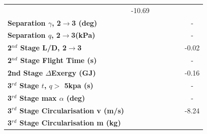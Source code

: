 \begin{table}[ht!]
\begin{tabular}{l c c c c c c}
		&-10.69
		\\
		\textbf{Separation $\gamma$, 2$\rightarrow$3 (deg)}
		& \secondthirdSeparationgammaCdNinetyNoReturn
		& \secondthirdSeparationgammaCdNinetyFiveNoReturn
		& \secondthirdSeparationgammaCdStandardNoReturn
		& \secondthirdSeparationgammaCdOneHundredFiveNoReturn
		& \secondthirdSeparationgammaCdOneHundredTenNoReturn
		& -
		\\
		\textbf{Separation $q$, 2$\rightarrow$3(kPa)}
		& \secondthirdSeparationqCdNinetyNoReturn
		& \secondthirdSeparationqCdNinetyFiveNoReturn
		& \secondthirdSeparationqCdStandardNoReturn
		& \secondthirdSeparationqCdOneHundredFiveNoReturn
		& \secondthirdSeparationqCdOneHundredTenNoReturn
		& -
		\\
		\textbf{2$^{nd}$ Stage L/D, 2$\rightarrow$3}
		& \secondthirdSeparationLDCdNinetyNoReturn
		& \secondthirdSeparationLDCdNinetyFiveNoReturn
		& \secondthirdSeparationLDCdStandardNoReturn
		& \secondthirdSeparationLDCdOneHundredFiveNoReturn
		& \secondthirdSeparationLDCdOneHundredTenNoReturn
		&-0.02
		\\
		\textbf{2$^{nd}$ Stage Flight Time (s)}
		& \secondFlightTimeCdNinetyNoReturn
		& \secondFlightTimeCdNinetyFiveNoReturn
		& \secondFlightTimeCdStandardNoReturn
		& \secondFlightTimeCdOneHundredFiveNoReturn
		& \secondFlightTimeCdOneHundredTenNoReturn
		& -
		\\
		\textbf{2nd Stage $\Delta$Exergy (GJ)}
		& \seconddExergyCdNinetyNoReturn
		& \seconddExergyCdNinetyFiveNoReturn
		& \seconddExergyCdStandardNoReturn
		& \seconddExergyCdOneHundredFiveNoReturn
		& \seconddExergyCdOneHundredTenNoReturn
		&-0.16
		\\
		\textbf{3$^{rd}$ Stage $t$, $q >$ 5kpa (s)}
		& \thirdqOverFiveCdNinetyNoReturn
		& \thirdqOverFiveCdNinetyFiveNoReturn
		& \thirdqOverFiveCdStandardNoReturn
		& \thirdqOverFiveCdOneHundredFiveNoReturn
		& \thirdqOverFiveCdOneHundredTenNoReturn
		& -
		\\
		\textbf{3$^{rd}$ Stage max $\alpha$ (deg)}
		& \thirdmaxAoACdNinetyNoReturn
		& \thirdmaxAoACdNinetyFiveNoReturn
		& \thirdmaxAoACdStandardNoReturn
		& \thirdmaxAoACdOneHundredFiveNoReturn
		& \thirdmaxAoACdOneHundredTenNoReturn
		& -
		\\
		\textbf{3$^{rd}$ Stage Circularisation v (m/s)}
		& \thirdcircvCdNinetyNoReturn
		& \thirdcircvCdNinetyFiveNoReturn
		& \thirdcircvCdStandardNoReturn
		& \thirdcircvCdOneHundredFiveNoReturn
		& \thirdcircvCdOneHundredTenNoReturn
		&-8.24
		\\
		\textbf{3$^{rd}$ Stage Circularisation m (kg)}

\end{tabular}
\end{table}
